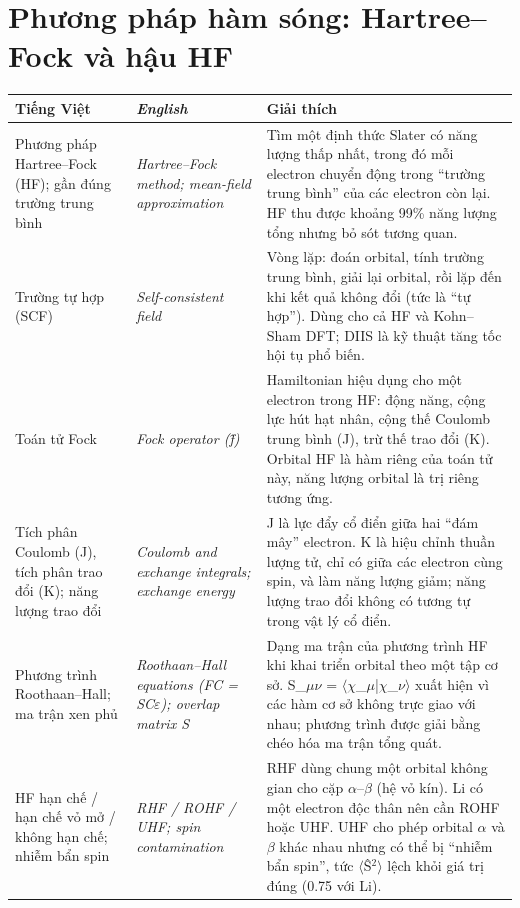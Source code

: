 \section*{Phương pháp hàm sóng: Hartree–Fock và hậu HF}
\begin{longtable}{@{}>{\raggedright\arraybackslash}p{}>{\raggedright\arraybackslash\itshape}p{}>{\raggedright\arraybackslash}p{}@{}}
\toprule \textbf{Tiếng Việt} & \textbf{\upshape English} & \textbf{Giải thích} \\ \midrule \endhead
Phương pháp Hartree–Fock (HF); gần đúng trường trung bình & Hartree–Fock method; mean-field approximation & Tìm một định thức Slater có năng lượng thấp nhất, trong đó mỗi electron chuyển động trong ``trường trung bình'' của các electron còn lại. HF thu được khoảng 99\% năng lượng tổng nhưng bỏ sót tương quan. \\[2pt]
Trường tự hợp (SCF) & Self-consistent field & Vòng lặp: đoán orbital, tính trường trung bình, giải lại orbital, rồi lặp đến khi kết quả không đổi (tức là ``tự hợp''). Dùng cho cả HF và Kohn–Sham DFT; DIIS là kỹ thuật tăng tốc hội tụ phổ biến. \\[2pt]
Toán tử Fock & Fock operator (f̂) & Hamiltonian hiệu dụng cho một electron trong HF: động năng, cộng lực hút hạt nhân, cộng thế Coulomb trung bình (J), trừ thế trao đổi (K). Orbital HF là hàm riêng của toán tử này, năng lượng orbital là trị riêng tương ứng. \\[2pt]
Tích phân Coulomb (J), tích phân trao đổi (K); năng lượng trao đổi & Coulomb and exchange integrals; exchange energy & J là lực đẩy cổ điển giữa hai ``đám mây'' electron. K là hiệu chỉnh thuần lượng tử, chỉ có giữa các electron cùng spin, và làm năng lượng giảm; năng lượng trao đổi không có tương tự trong vật lý cổ điển. \\[2pt]
Phương trình Roothaan–Hall; ma trận xen phủ & Roothaan–Hall equations (FC = SC$\varepsilon$); overlap matrix S & Dạng ma trận của phương trình HF khi khai triển orbital theo một tập cơ sở. S\_$\mu\nu$ = $\langle\chi$\_$\mu$|$\chi$\_$\nu\rangle$ xuất hiện vì các hàm cơ sở không trực giao với nhau; phương trình được giải bằng chéo hóa ma trận tổng quát. \\[2pt]
HF hạn chế / hạn chế vỏ mở / không hạn chế; nhiễm bẩn spin & RHF / ROHF / UHF; spin contamination & RHF dùng chung một orbital không gian cho cặp $\alpha$–$\beta$ (hệ vỏ kín). Li có một electron độc thân nên cần ROHF hoặc UHF. UHF cho phép orbital $\alpha$ và $\beta$ khác nhau nhưng có thể bị ``nhiễm bẩn spin'', tức $\langle$Ŝ$^{2}\rangle$ lệch khỏi giá trị đúng (0.75 với Li). \\[2pt]

\end{longtable}
